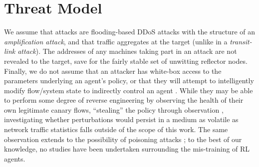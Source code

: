 \documentclass[conference, letterpaper, 10pt, times]{IEEEtran}
\begin{document}
%

\section{Threat Model}


We assume that attacks are flooding-based DDoS attacks with the structure of an \emph{amplification attack}, and that traffic aggregates at the target (unlike in a \emph{transit-link attack}).
The addresses of any machines taking part in an attack are not revealed to the target, save for the fairly stable set of unwitting reflector nodes.
Finally, we do not assume that an attacker has white-box access to the parameters underlying an agent's policy, or that they will attempt to intelligently modify flow/system state to indirectly control an agent \cite{DBLP:conf/eurosp/PapernotMJFCS16, DBLP:conf/eurosp/PapernotMSW18, DBLP:journals/corr/HuangPGDA17, DBLP:conf/sp/Carlini017}.
While they may be able to perform some degree of reverse engineering by observing the health of their own legitimate canary flows, ``stealing'' the policy through observation \cite{DBLP:conf/uss/TramerZJRR16}, investigating whether perturbations would persist in a medium as volatile as network traffic statistics falls outside of the scope of this work.
The same observation extends to the possibility of poisoning attacks \cite{DBLP:journals/jmlr/KloftL10, DBLP:conf/acsac/ShenTS16}; to the best of our knowledge, no studies have been undertaken surrounding the mis-training of RL agents.
\end{document}
